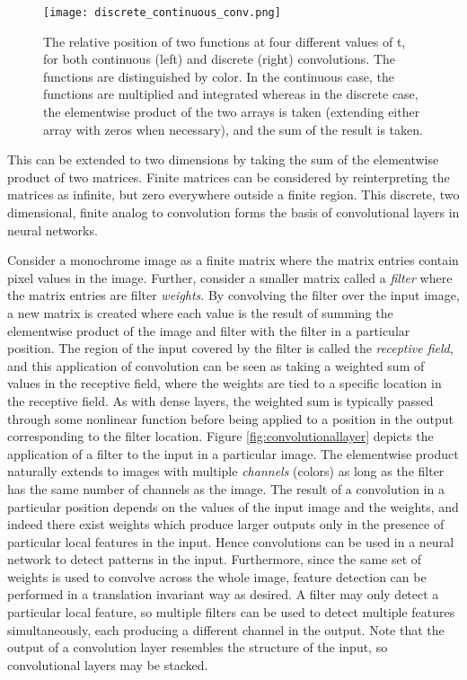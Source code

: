 \begin{figure}
	\centering
	\texttt{[image: discrete\_continuous\_conv.png]}
	\caption{The relative position of two functions at four different values of t, for both continuous (left) and discrete (right) convolutions. The functions are distinguished by color. In the continuous case, the functions are multiplied and integrated whereas in the discrete case, the elementwise product of the two arrays is taken (extending either array with zeros when necessary), and the sum of the result is taken.}
	\label{fig:cont_disc_conv}
\end{figure}

This can be extended to two dimensions by taking the sum of the elementwise product of two matrices.
Finite matrices can be considered by reinterpreting the matrices as infinite, but zero everywhere outside a finite region.
This discrete, two dimensional, finite analog to convolution forms the basis of convolutional layers in neural networks.

Consider a monochrome image as a finite matrix where the matrix entries contain pixel values in the image. 
Further, consider a smaller matrix called a \textit{filter} where the matrix entries are filter \textit{weights}.
By convolving the filter over the input image, a new matrix is created where each value is the result of summing the elementwise product of the image and filter with the filter in a particular position.
The region of the input covered by the filter is called the \textit{receptive field}, and this application of convolution can be seen as taking a weighted sum of values in the receptive field, where the weights are tied to a specific location in the receptive field.
As with dense layers, the weighted sum is typically passed through some nonlinear function before being applied to a position in the output corresponding to the filter location.
Figure \ref{fig:convolutionallayer} depicts the application of a filter to the input in a particular image.
The elementwise product naturally extends to images with multiple \textit{channels} (colors) as long as the filter has the same number of channels as the image.
The result of a convolution in a particular position depends on the values of the input image and the weights, and indeed there exist weights which produce larger outputs only in the presence of particular local features in the input.
Hence convolutions can be used in a neural network to detect patterns in the input.
Furthermore, since the same set of weights is used to convolve across the whole image, feature detection can be performed in a translation invariant way as desired. 
A filter may only detect a particular local feature, so multiple filters can be used to detect multiple features simultaneously, each producing a different channel in the output.
Note that the output of a convolution layer resembles the structure of the input, so convolutional layers may be stacked.


